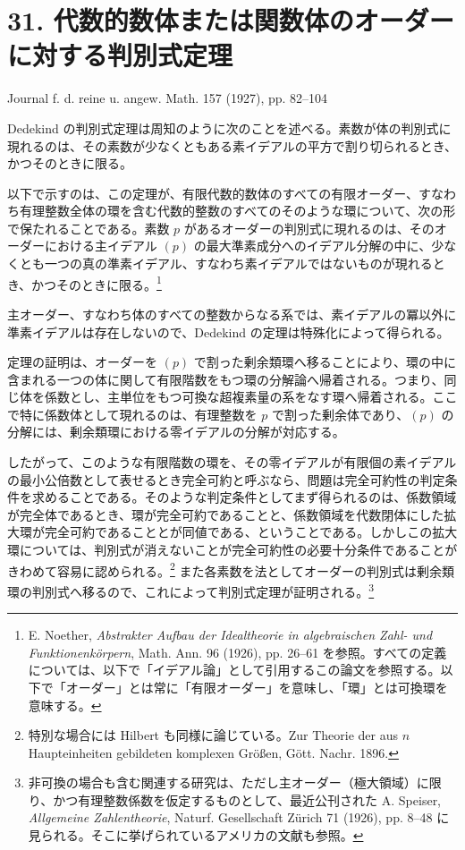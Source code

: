 \documentclass[11pt]{article}
\begin{document}
\section*{31. 代数的数体または関数体のオーダーに対する判別式定理}
\begin{center}
Journal f. d. reine u. angew. Math. 157 (1927), pp. 82--104
\end{center}

Dedekind の判別式定理は周知のように次のことを述べる。素数が体の判別式に現れるのは、その素数が少なくともある素イデアルの平方で割り切られるとき、かつそのときに限る。

以下で示すのは、この定理が、有限代数的数体のすべての有限オーダー、すなわち有理整数全体の環を含む代数的整数のすべてのそのような環について、次の形で保たれることである。素数 $p$ があるオーダーの判別式に現れるのは、そのオーダーにおける主イデアル $(p)$ の最大準素成分へのイデアル分解の中に、少なくとも一つの真の準素イデアル、すなわち素イデアルではないものが現れるとき、かつそのときに限る。\footnote{E. Noether, \emph{Abstrakter Aufbau der Idealtheorie in algebraischen Zahl- und Funktionenkörpern}, Math. Ann. 96 (1926), pp. 26--61 を参照。すべての定義については、以下で「イデアル論」として引用するこの論文を参照する。以下で「オーダー」とは常に「有限オーダー」を意味し、「環」とは可換環を意味する。}

主オーダー、すなわち体のすべての整数からなる系では、素イデアルの冪以外に準素イデアルは存在しないので、Dedekind の定理は特殊化によって得られる。

定理の証明は、オーダーを $(p)$ で割った剰余類環へ移ることにより、環の中に含まれる一つの体に関して有限階数をもつ環の分解論へ帰着される。つまり、同じ体を係数とし、主単位をもつ可換な超複素量の系をなす環へ帰着される。ここで特に係数体として現れるのは、有理整数を $p$ で割った剰余体であり、$(p)$ の分解には、剰余類環における零イデアルの分解が対応する。

したがって、このような有限階数の環を、その零イデアルが有限個の素イデアルの最小公倍数として表せるとき完全可約と呼ぶなら、問題は完全可約性の判定条件を求めることである。そのような判定条件としてまず得られるのは、係数領域が完全体であるとき、環が完全可約であることと、係数領域を代数閉体にした拡大環が完全可約であることとが同値である、ということである。しかしこの拡大環については、判別式が消えないことが完全可約性の必要十分条件であることがきわめて容易に認められる。\footnote{特別な場合には Hilbert も同様に論じている。Zur Theorie der aus $n$ Haupteinheiten gebildeten komplexen Größen, Gött. Nachr. 1896.} また各素数を法としてオーダーの判別式は剰余類環の判別式へ移るので、これによって判別式定理が証明される。\footnote{非可換の場合も含む関連する研究は、ただし主オーダー（極大領域）に限り、かつ有理整数係数を仮定するものとして、最近公刊された A. Speiser, \emph{Allgemeine Zahlentheorie}, Naturf. Gesellschaft Zürich 71 (1926), pp. 8--48 に見られる。そこに挙げられているアメリカの文献も参照。}
\end{document}
